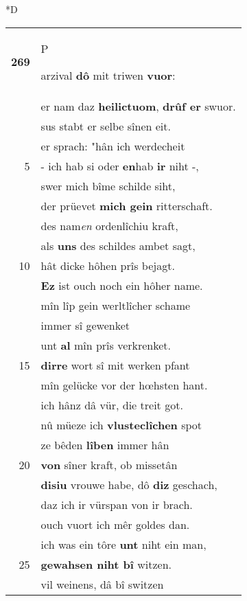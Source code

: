 \documentclass[8pt,a4paper,notitlepage]{article}
\begin{document}
\begin{table}[ht]
\begin{minipage}[t]{0.5\linewidth}
\small
\begin{center}*D
\end{center}
\begin{tabular}{rl}
\textbf{269} & \begin{large}P\end{large}arzival \textbf{dô} mit triwen \textbf{vuor}:\\ 
 & er nam daz \textbf{heilictuom}, \textbf{drûf er} swuor.\\ 
 & sus stabt er selbe sînen eit.\\ 
 & er sprach: "hân ich werdecheit\\ 
5 & - ich hab si oder \textbf{en}hab \textbf{ir} niht -,\\ 
 & swer mich bîme schilde siht,\\ 
 & der prüevet \textbf{mich gein} ritterschaft.\\ 
 & des nam\textit{en} ordenlîchiu kraft,\\ 
 & als \textbf{uns} des schildes ambet sagt,\\ 
10 & hât dicke hôhen prîs bejagt.\\ 
 & \textbf{Ez} ist ouch noch ein hôher name.\\ 
 & mîn lîp gein werltlîcher schame\\ 
 & immer sî gewenket\\ 
 & unt \textbf{al} mîn prîs verkrenket.\\ 
15 & \textbf{dirre} wort sî mit werken pfant\\ 
 & mîn gelücke vor der hœhsten hant.\\ 
 & ich hânz dâ vür, die treit got.\\ 
 & nû müeze ich \textbf{vlusteclîchen} spot\\ 
 & ze bêden \textbf{lîben} immer hân\\ 
20 & \textbf{von} sîner kraft, ob missetân\\ 
 & \textbf{disiu} vrouwe habe, dô \textbf{diz} geschach,\\ 
 & daz ich ir vürspan von ir brach.\\ 
 & ouch vuort ich mêr goldes dan.\\ 
 & ich was ein tôre \textbf{unt} niht ein man,\\ 
25 & \textbf{gewahsen niht bî} witzen.\\ 
 & vil weinens, dâ bî switzen\\ 

\end{tabular}
\end{minipage}
\end{table}
\end{document}

